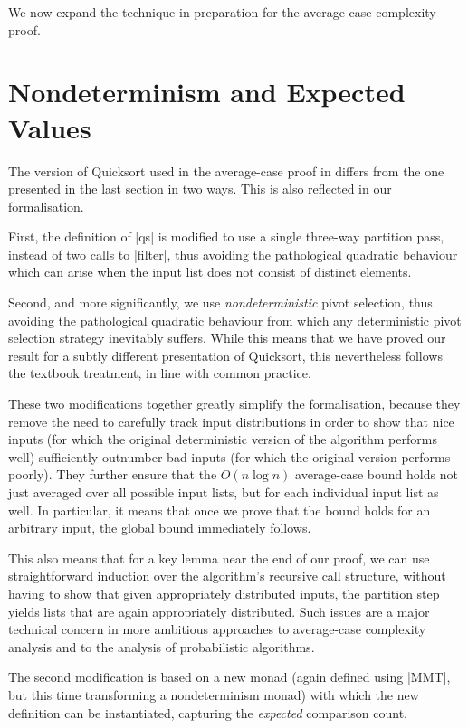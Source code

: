 \documentclass[runningheads]{llncs}
\begin{document}
We now expand the technique in preparation for the average-case complexity proof.

\section{Nondeterminism and Expected Values}
\label{nondetexpec}


The version of Quicksort used in the average-case proof in \cite{introtoalgos}
differs from the one presented in the last section in two ways. This is also
reflected in our formalisation.  

First, the definition of |qs| is modified to use a single three-way partition
pass, instead of two calls to |filter|, thus avoiding the pathological
quadratic behaviour which can arise when the input list does not consist of
distinct elements.

Second, and more significantly, we use \emph{nondeterministic} pivot
selection, thus avoiding the pathological quadratic behaviour from which
any deterministic pivot selection strategy inevitably suffers. While this
means that we have proved our result for a subtly different presentation of
Quicksort, this nevertheless follows the textbook treatment, in line with
common practice.

These two modifications together greatly simplify the formalisation, because
they remove the need to carefully track input distributions in order to show
that nice inputs (for which the original deterministic version of the
algorithm performs well) sufficiently outnumber bad inputs (for which the
original version performs poorly). They further ensure that the $O(n \log n)$
average-case bound holds not just averaged over all possible input lists, but
for each individual input list as well. In particular, it means that once we
prove that the bound holds for an arbitrary input, the global bound
immediately follows.

This also means that for a key lemma near the end of our proof, we can use
straightforward induction over the algorithm's recursive call structure,
without having to show that given appropriately distributed inputs, the
partition step yields lists that are again appropriately distributed. Such
issues are a major technical concern in more ambitious approaches to
average-case complexity analysis \cite[for example]{modularcalculus} and to
the analysis of probabilistic algorithms.

The second modification is based on a new monad (again defined using |MMT|,
but this time transforming a nondeterminism monad) with which the new
definition can be instantiated, capturing the \emph{expected} comparison
count.
\end{document}
